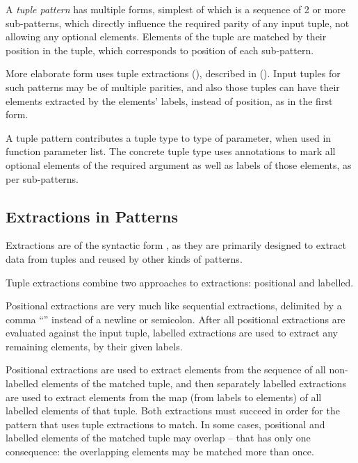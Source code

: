 A {\em tuple pattern} has multiple forms, simplest of which is a sequence of 2 or more sub-patterns, which directly influence the required parity of any input tuple, not allowing any optional elements. Elements of the tuple are matched by their position in the tuple, which corresponds to position of each sub-pattern. 

More elaborate form uses tuple extractions (), described in (). Input tuples for such patterns may be of multiple parities, and also those tuples can have their elements extracted by the elements' labels, instead of position, as in the first form. 

A tuple pattern contributes a tuple type to type of parameter, when used in function parameter list. The concrete tuple type uses annotations to mark all optional elements of the required argument as well as labels of those elements, as per sub-patterns. 





\subsection{Extractions in Patterns}
\label{sec:extractions-in-patterns}

Extractions are of the syntactic form , as they are primarily designed to extract data from tuples and reused by other kinds of patterns. 

Tuple extractions combine two approaches to extractions: positional and labelled. 

Positional extractions are very much like sequential extractions, delimited by a comma ``\code{,}'' instead of a newline or semicolon. After all positional extractions are evaluated against the input tuple, labelled extractions are used to extract any remaining elements, by their given labels. 

Positional extractions are used to extract elements from the sequence of all non-labelled elements of the matched tuple, and then separately labelled extractions are used to extract elements from the map (from labels to elements) of all labelled elements of that tuple. Both extractions must succeed in order for the pattern that uses tuple extractions to match. In some cases, positional and labelled elements of the matched tuple may overlap -- that has only one consequence: the overlapping elements may be matched more than once. 


